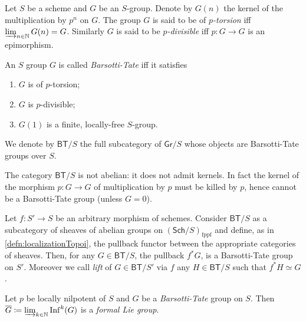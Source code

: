\begin{defn}
	Let $S$ be a scheme and $G$ be an $S$-group.
	Denote by $G(n)$ the kernel of the multiplication by $p^n$ on $G$.
	The group $G$ is said to be of \emph{$p$-torsion} iff $\varinjlim_{n \in \mathbb{N}} G(n) = G$.
	Similarly $G$ is said to be \emph{$p$-divisible} iff $p\colon G \to G$
	is an epimorphism.
\end{defn}


\begin{defn}\label{BTGroup}
	An $S$ group $G$ is called \emph{Barsotti-Tate} iff it satisfies
\begin{enumerate}
	\item $G$ is of $p$-torsion;
	\item $G$ is $p$-divisible;
	\item $G(1)$ is a finite, locally-free $S$-group.
\end{enumerate}
	We denote by $\mathsf{BT}/S$ the full subcategory of $\mathsf{Gr}/S$
	whose objects are Barsotti-Tate groups over $S$.
\end{defn}


\begin{rem}[]
	The category $\mathsf{BT}/S$ is not abelian:
	it does not admit kernels.
	In fact the kernel of the morphism $p\colon G \to G$
	of multiplication by $p$ must be killed by $p$, hence cannot be
	a Barsotti-Tate group (unless $G=0$).
\end{rem}


\begin{rem}
	Let $f\colon S' \to S$ be an arbitrary morphism of schemes.
	Consider $\mathsf{BT}/S$ as a subcategory of sheaves
	of abelian groups on $\left( \mathsf{Sch}/S  \right)_{\mathrm{fppf}}$
	and define, as in \cref{defn:localizationTopoi}, the pullback
	functor between the appropriate categories of sheaves.
	Then, for any $G \in \mathsf{BT}/S$, the pullback $f^* G$,
	is a Barsotti-Tate group on $S'$.
	Moreover we call \emph{lift} of $G \in \mathsf{BT}/S'$ via $f$ any 
	$H \in \mathsf{BT}/S$ such that $f^*H \simeq G$.
\end{rem}


\begin{lem}
	Let $p$ be locally nilpotent of $S$ and $G$ be a \emph{Barsotti-Tate} group on $S$.
	Then
	$\overline{G} \coloneqq \varinjlim_{k \in \mathbb{N}} \mathrm{Inf}^k(G)$
	is a \emph{formal Lie group}.
\end{lem}


